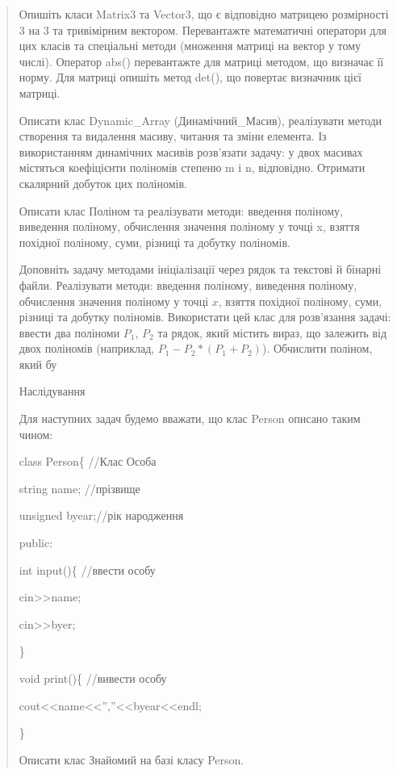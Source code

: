 \documentclass[]{article}
\begin{document}
\begin{quote}
\protect\hypertarget{_Hlk65950809}{}{}Опишіть класи Matrix3 та Vector3,
що є відповідно матрицею розмірності 3 на 3 та тривімірним вектором.
Перевантажте математичні оператори для цих класів та спеціальні методи
(множення матриці на вектор у тому числі). Оператор abs() перевантажте
для матриці методом, що визначає її норму. Для матриці опишіть метод
det(), що повертає визначник цієї матриці.

Описати клас Dynamic\_Array (Динамічний\_Масив), реалізувати методи
створення та видалення масиву, читання та зміни елемента. Із
використанням динамічних масивів розв'язати задачу: у двох масивах
містяться коефіцієнти поліномів степеню m і n, відповідно. Отримати
скалярний добуток цих поліномів.

Описати клас Поліном та реалізувати методи: введення поліному, виведення
поліному, обчислення значення поліному у точці x, взяття похідної
поліному, суми, різниці та добутку поліномів.

Доповніть задачу методами ініціалізації через рядок та текстові й
бінарні файли. Реалізувати методи: введення поліному, виведення
поліному, обчислення значення поліному у точці \(x\), взяття похідної
поліному, суми, різниці та добутку поліномів. Використати цей клас для
розв'язання задачі: ввести два поліноми \(P_{1}\), \(P_{2}\) та рядок,
який містить вираз, що залежить від двох поліномів (наприклад,
\(P_{1} - P_{2}*(P_{1} + P_{2})\)). Обчислити поліном, який бу


Наслідування

\protect\hypertarget{_Hlk65951291}{}{}Для наступних задач будемо
вважати, що клас Person описано таким чином:

class Person\{ //Клас Особа

string name; //прізвище

unsigned byear;//рік народження

public:

int input()\{ //ввести особу

cin\textgreater{}\textgreater{}name;

cin\textgreater{}\textgreater{}byer;

\}

void print()\{ //вивести особу

cout\textless{}\textless{}name\textless{}\textless{}'',''\textless{}\textless{}byear\textless{}\textless{}endl;

\}

Описати клас Знайомий на базі класу Person.


\end{quote}
\end{document}
